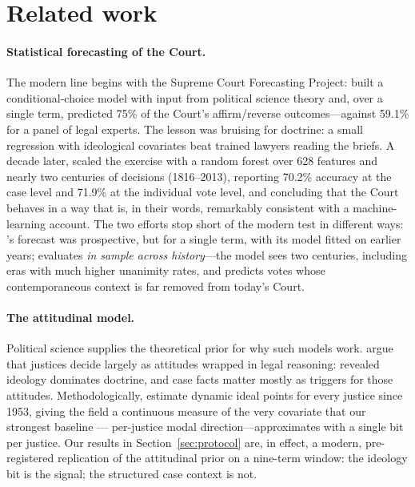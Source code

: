 \section{Related work}\label{sec:related}

\paragraph{Statistical forecasting of the Court.}
The modern line begins with the Supreme Court Forecasting Project:
\citet{ruger2004} built a conditional-choice model with input from
political science theory and, over a single term, predicted 75\% of the
Court's affirm/reverse outcomes---against 59.1\% for a panel of
legal experts. The lesson was bruising for doctrine: a small
regression with ideological covariates beat trained lawyers reading
the briefs. A decade later, \citet{katz2017} scaled the exercise with
a random forest over 628 features and nearly two centuries of
decisions (1816--2013), reporting 70.2\% accuracy at the case level
and 71.9\% at the individual vote level, and concluding that the
Court behaves in a way that is, in their words, remarkably consistent
with a machine-learning account. The two efforts stop short of the
modern test in different ways: \citet{ruger2004}'s forecast was
prospective, but for a single term, with its model fitted on earlier
years; \citet{katz2017} evaluates \emph{in sample across history}---the
model sees two centuries, including eras with much higher unanimity
rates, and predicts votes whose contemporaneous context is far removed
from today's Court.

\paragraph{The attitudinal model.}
Political science supplies the theoretical prior for why such models
work. \citet{segal2002} argue that justices decide largely as
attitudes wrapped in legal reasoning: revealed ideology dominates
doctrine, and case facts matter mostly as triggers for those
attitudes. Methodologically, \citet{martin2002} estimate dynamic
ideal points for every justice since 1953, giving the field a
continuous measure of the very covariate that our strongest baseline
--- per-justice modal direction---approximates with a single bit per
justice. Our results in Section~\ref{sec:protocol} are, in effect, a
modern, pre-registered replication of the attitudinal prior on a
nine-term window: the ideology bit is the signal; the structured case
context is not.

